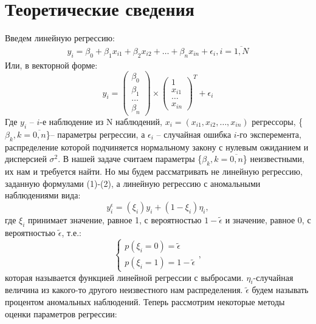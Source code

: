 \documentclass[12pt]{article}
\begin{document}
\section{Теоретические сведения}
Введем линейную регрессию:\hfill\break
\begin{eqnarray}
    y_i=\beta_0+\beta_1 x_{i1}+\beta_2 x_{i2}+\dots+\beta_n x_{in}+\epsilon_i, i=\overline{1,N}
\end{eqnarray}
Или, в векторной форме:
\begin{equation}
    y_i= 
    \begin{pmatrix}
        \beta_0\\
        \beta_1\\
        \dots\\
        \beta_n
    \end{pmatrix}\times
    \begin{pmatrix}
        1\\
        x_{i1}\\
        \dots\\
        x_{in}
    \end{pmatrix}^{T}+ \epsilon_i
\end{equation}
Где $y_i$ -- $i$-е наблюдение из N наблюдений, $x_i=(x_{i1},x_{i2},\dots,x_{in})$ регрессоры, \{$\beta_k, k=\overline{0,n}$\}-- параметры регрессии, а $\epsilon_i$ -- случайная ошибка $i$-го эксперемента, распределение которой подчиняется нормальному закону с нулевым ожиданием и дисперсией $\sigma^2$.\hfill\break
В нашей задаче считаем параметры \{$\beta_k, k=\overline{0,n}$\} неизвестными, их нам и требуется найти.\hfill\break
Но мы будем рассматривать не линейную регрессию, заданную формулами (1)-(2), а линейную регрессию с аномальными наблюдениями вида:
\begin{equation}
    y_i^{\epsilon}=(\xi_i)y_i+ (1-\xi_i)\eta_i,
\end{equation}
где $\xi_i$ принимает значение, равное 1, с вероятностью $1-\widetilde{\epsilon}$ и значение, равное 0, с вероятностью $\widetilde{\epsilon}$, т.е.:
\begin{equation}
    \begin{cases}
        p(\xi_i=0)=\widetilde{\epsilon}\\
        p(\xi_i=1)=1-\widetilde{\epsilon}
    \end{cases},
\end{equation}
которая называется функцией линейной регрессии с выбросами. $\eta_i$-случайная величина из какого-то другого неизвестного нам распределения. $\widetilde{\epsilon}$ будем называть процентом аномальных наблюдений.\hfill\break
Теперь рассмотрим некоторые методы оценки параметров регрессии:
\end{document}
